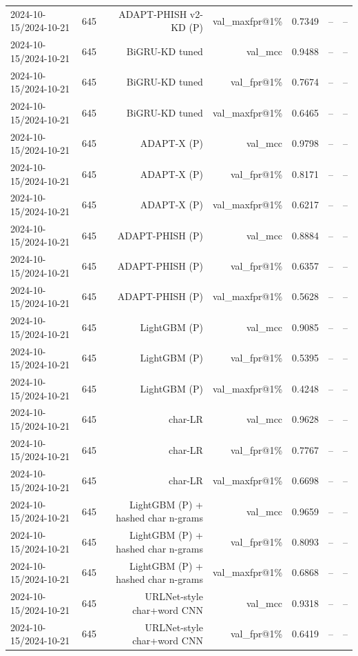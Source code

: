 \begin{table}[t]
\begin{tabular}{llrrrrr}
2024-10-15/2024-10-21 & 645 & ADAPT-PHISH v2-KD (P) & val\_maxfpr@1\% & 0.7349 & -- & -- \\
2024-10-15/2024-10-21 & 645 & BiGRU-KD tuned & val\_mcc & 0.9488 & -- & -- \\
2024-10-15/2024-10-21 & 645 & BiGRU-KD tuned & val\_fpr@1\% & 0.7674 & -- & -- \\
2024-10-15/2024-10-21 & 645 & BiGRU-KD tuned & val\_maxfpr@1\% & 0.6465 & -- & -- \\
2024-10-15/2024-10-21 & 645 & ADAPT-X (P) & val\_mcc & 0.9798 & -- & -- \\
2024-10-15/2024-10-21 & 645 & ADAPT-X (P) & val\_fpr@1\% & 0.8171 & -- & -- \\
2024-10-15/2024-10-21 & 645 & ADAPT-X (P) & val\_maxfpr@1\% & 0.6217 & -- & -- \\
2024-10-15/2024-10-21 & 645 & ADAPT-PHISH (P) & val\_mcc & 0.8884 & -- & -- \\
2024-10-15/2024-10-21 & 645 & ADAPT-PHISH (P) & val\_fpr@1\% & 0.6357 & -- & -- \\
2024-10-15/2024-10-21 & 645 & ADAPT-PHISH (P) & val\_maxfpr@1\% & 0.5628 & -- & -- \\
2024-10-15/2024-10-21 & 645 & LightGBM (P) & val\_mcc & 0.9085 & -- & -- \\
2024-10-15/2024-10-21 & 645 & LightGBM (P) & val\_fpr@1\% & 0.5395 & -- & -- \\
2024-10-15/2024-10-21 & 645 & LightGBM (P) & val\_maxfpr@1\% & 0.4248 & -- & -- \\
2024-10-15/2024-10-21 & 645 & char-LR & val\_mcc & 0.9628 & -- & -- \\
2024-10-15/2024-10-21 & 645 & char-LR & val\_fpr@1\% & 0.7767 & -- & -- \\
2024-10-15/2024-10-21 & 645 & char-LR & val\_maxfpr@1\% & 0.6698 & -- & -- \\
2024-10-15/2024-10-21 & 645 & LightGBM (P) + hashed char n-grams & val\_mcc & 0.9659 & -- & -- \\
2024-10-15/2024-10-21 & 645 & LightGBM (P) + hashed char n-grams & val\_fpr@1\% & 0.8093 & -- & -- \\
2024-10-15/2024-10-21 & 645 & LightGBM (P) + hashed char n-grams & val\_maxfpr@1\% & 0.6868 & -- & -- \\
2024-10-15/2024-10-21 & 645 & URLNet-style char+word CNN & val\_mcc & 0.9318 & -- & -- \\
2024-10-15/2024-10-21 & 645 & URLNet-style char+word CNN & val\_fpr@1\% & 0.6419 & -- & -- \\

\end{tabular}
\end{table}
